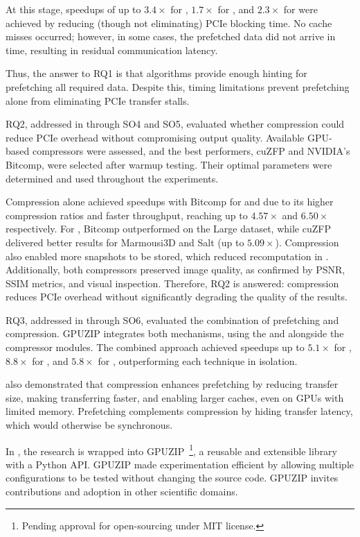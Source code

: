 \documentclass[Ingles,Final]{ic-tese-v3}
\begin{document}
At this stage, speedups of up to $3.4\times$ for \revolve, $1.7\times$ for \zcut, and $2.3\times$ for \uniform were achieved by reducing (though not eliminating) PCIe blocking time. No cache misses occurred; however, in some cases, the prefetched data did not arrive in time, resulting in residual communication latency.

Thus, the answer to RQ1 is that \checkpointing algorithms provide enough hinting for prefetching all required data. Despite this, timing limitations prevent prefetching alone from eliminating PCIe transfer stalls.

RQ2, addressed in  through SO4 and SO5, evaluated whether compression could reduce PCIe overhead without compromising output quality. Available GPU-based compressors were assessed, and the best performers, cuZFP and NVIDIA's Bitcomp, were selected after warmup testing. Their optimal parameters were determined and used throughout the experiments.

Compression alone achieved speedups with Bitcomp for \revolve and \zcut due to its higher compression ratios and faster throughput, reaching up to $4.57\times$ and $6.50\times$ respectively. For \uniform, Bitcomp outperformed on the Large dataset, while cuZFP delivered better results for Marmousi3D and Salt (up to $5.09\times$). Compression also enabled more snapshots to be stored, which reduced recomputation in \uniform. Additionally, both compressors preserved image quality, as confirmed by PSNR, SSIM metrics, and visual inspection. Therefore, RQ2 is answered: compression reduces PCIe overhead without significantly degrading the quality of the results.

RQ3, addressed in  through SO6, evaluated the combination of prefetching and compression. GPUZIP integrates both mechanisms, using the \cache and \psa alongside the compressor modules. The combined approach achieved speedups up to $5.1\times$ for \revolve, $8.8\times$ for \zcut, and $5.8\times$ for \uniform, outperforming each technique in isolation.

 also demonstrated that compression enhances prefetching by reducing transfer size, making transferring faster, and enabling larger caches, even on GPUs with limited memory. Prefetching complements compression by hiding \htd transfer latency, which would otherwise be synchronous.

In , the research is wrapped into GPUZIP~\cite{githubrepo}\footnote{Pending approval for open-sourcing under MIT license.}, a reusable and extensible library with a Python API. GPUZIP made experimentation efficient by allowing multiple configurations to be tested without changing the \awave source code. GPUZIP invites contributions and adoption in other scientific domains.
\end{document}
